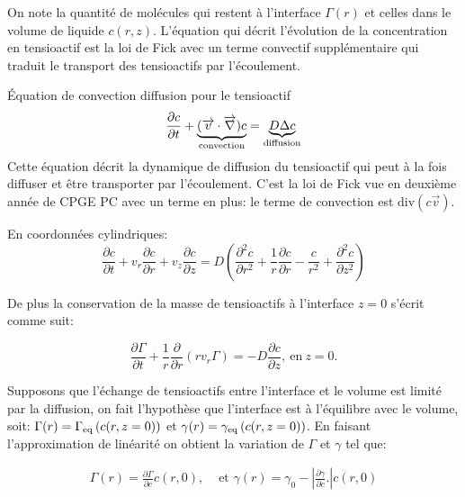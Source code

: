 \documentclass[french, 10pt]{article}
\begin{document}
On note la quantité de molécules qui restent à l'interface $\Gamma(r)$ et celles dans le volume de liquide $c(r,z)$. L'équation qui décrit l'évolution de la concentration en tensioactif est la loi de Fick avec un terme convectif supplémentaire qui traduit le transport des tensioactifs par l'écoulement.\medskip

\begin{Programme}{Équation de convection diffusion pour le tensioactif}
  \begin{equation}
    \dfrac{\partial c}{\partial t}+ \underbrace{(\vec{v}\cdot \vec{\nabla})c}_{\text{convection}}=\underbrace{D\Delta c}_{\rm diffusion}
  \end{equation}
  Cette équation décrit la dynamique de diffusion du tensioactif qui peut à la fois diffuser et être transporter par l'écoulement. C'est la loi de Fick vue en deuxième année de CPGE PC avec un terme en plus: le terme de convection est $\text{div}(c\vec{v})$.
\end{Programme} 
% 
En coordonnées cylindriques:
\begin{equation}
  \frac{\partial c}{\partial t}+v_r\frac{\partial c}{\partial r}+v_z\frac{\partial c}{\partial z}=D\left(\frac{\partial ^2 c}{\partial r^2}+\frac{1}{r}\frac{\partial c}{\partial r}-\frac{c}{r^2}+\frac{\partial ^2 c}{\partial z^2}\right)\label{eq:transporttensioactif}
  \end{equation}

De plus la conservation de la masse de tensioactifs à l'interface $z=0$ s'écrit comme suit: 

\begin{equation}
  \frac{\partial \Gamma}{\partial t}+\frac{1}{r}\frac{\partial }{\partial r}\left(r v_r \Gamma\right) = -D\frac{\partial c}{\partial z},~\text{en}~z=0.\label{eq:conservationdelamassedesurfactant}
\end{equation}



Supposons que l'échange de tensioactifs entre l'interface et le volume est limité par la diffusion, on fait l'hypothèse que l'interface est à l'équilibre avec le volume, soit: $\Gamma(r)=\Gamma_{\rm eq}\left(c(r,z=0)\right)$ et $\gamma(r)=\gamma_{\rm eq}\left(c(r,z=0)\right)$. En faisant l'approximation de linéarité on obtient la variation de $\Gamma$ et $\gamma$ tel que:

\begin{equation}
    \begin{array}{cc}
      \Gamma(r)=\frac{\partial \Gamma}{\partial c}c(r,0), & \text{ et } \gamma(r)=\gamma_0-\left|\frac{\partial \gamma}{\partial c}.\right|c(r,0)\label{eq:gradientconcentration}
   \end{array}
\end{equation}
\end{document}
